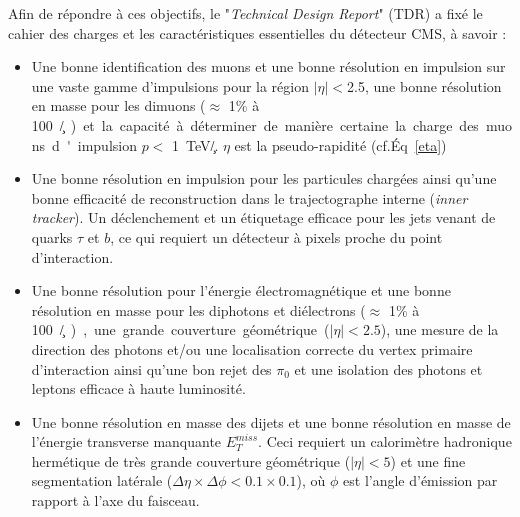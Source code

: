 Afin de répondre à ces objectifs, le "\textit{Technical Design Report}" (TDR) \cite{Bayatian:922757} a fixé le cahier des charges et les caractéristiques essentielles du détecteur CMS, à savoir :
\begin{itemize}[label=$\bullet$]
	\item Une bonne identification des muons et une bonne résolution en impulsion sur une vaste gamme d'impulsions pour la région $|\eta|<$\num{2.5}, une bonne résolution en masse pour les dimuons ($\approx$ \num{1}\% à \SI{100}{\giga\eV/\square\c}) et la capacité à déterminer de manière certaine la charge des muons d'impulsion $p<$ \SI{1}{\tera\eV/\c}. $\eta$ est la pseudo-rapidité (cf.Éq~\ref{eta})
	\item Une bonne résolution en impulsion pour les particules chargées ainsi qu'une bonne efficacité de reconstruction dans le trajectographe interne (\textit{inner tracker}). Un déclenchement et un étiquetage efficace pour les jets venant de quarks $\tau$ et $b$, ce qui requiert un détecteur à pixels proche du point d'interaction.
	\item Une bonne résolution pour l'énergie électromagnétique et une bonne résolution en masse pour les diphotons et diélectrons  ($\approx$ \num{1}\% à \SI{100}{\giga\eV/\square\c}), une grande couverture géométrique ($|\eta|<2.5$), une mesure de la direction des photons et/ou une localisation correcte du vertex primaire d'interaction ainsi qu'une bon rejet des $\pi_{0}$ et une isolation des photons et leptons efficace à haute luminosité.
	\item Une bonne résolution en masse des dijets et une bonne résolution en masse de l'énergie transverse manquante $E_{T}^{miss}$. Ceci requiert un calorimètre hadronique hermétique de très grande couverture géométrique ($|\eta|<5$) et une fine segmentation latérale ($\Delta\eta\times\Delta\phi<0.1\times0.1$), où $\phi$ est l'angle d'émission par rapport à l'axe du faisceau.
\end{itemize} 

